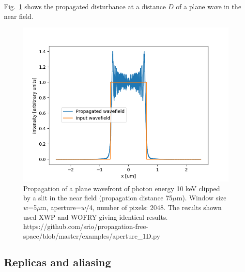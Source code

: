 \documentclass{iucr}              %
\newcommand{\ingreen}[1]{{\color{green}#1}}
\begin{document}
Fig.~\ref{fig: aperture_1D} shows the propagated disturbance at a distance $D$ of a plane wave in the near field.

\begin{figure}
\label{fig: aperture_1D}
\caption{Propagation of a plane wavefront of photon energy 10 keV clipped by a slit in the near field (propagation distance 75$\mu$m). Window size $w$=5$\mu$m, aperture=$w$/4, number of pixels: 2048. 
The results shown used XWP and WOFRY giving identical results. 
\ingreen{ https://github.com/srio/propagation-free-space/blob/master/examples/aperture\_1D.py}
}
\includegraphics[width=1\textwidth]{aperture_1D.png}
\end{figure}


\subsection{Replicas and aliasing}
\end{document}
